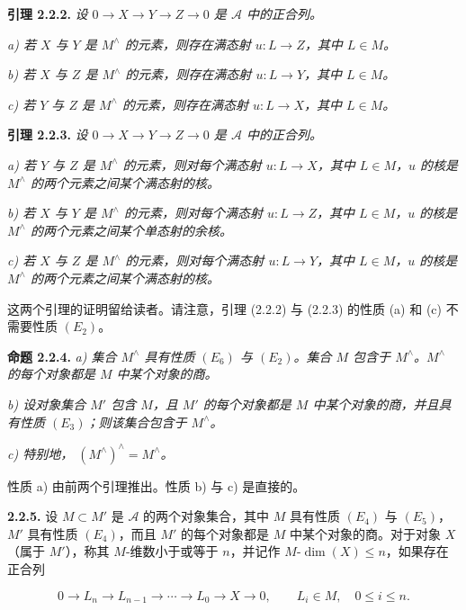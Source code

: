 \clearpage
{}%
\begingroup\small\setlength{\parskip}{0pt}\setlength{\emergencystretch}{1.5em}
\setlength{\abovedisplayskip}{4pt plus 2pt minus 2pt}%
\setlength{\belowdisplayskip}{4pt plus 2pt minus 2pt}%

\noindent\textbf{引理 2.2.2.}\quad
\textit{设
$0\longrightarrow X\longrightarrow Y\longrightarrow Z\longrightarrow0$
是 $\mathcal A$ 中的正合列。}

\noindent\textit{a) 若 $X$ 与 $Y$ 是 $M^{\wedge}$ 的元素，则存在满态射
$u\colon L\longrightarrow Z$，其中 $L\in M$。}

\noindent\textit{b) 若 $X$ 与 $Z$ 是 $M^{\wedge}$ 的元素，则存在满态射
$u\colon L\longrightarrow Y$，其中 $L\in M$。}

\noindent\textit{c) 若 $Y$ 与 $Z$ 是 $M^{\wedge}$ 的元素，则存在满态射
$u\colon L\longrightarrow X$，其中 $L\in M$。}

\medskip\noindent\textbf{引理 2.2.3.}\quad
\textit{设
$0\longrightarrow X\longrightarrow Y\longrightarrow Z\longrightarrow0$
是 $\mathcal A$ 中的正合列。}

\noindent\textit{a) 若 $Y$ 与 $Z$ 是 $M^{\wedge}$ 的元素，则对每个满态射
$u\colon L\longrightarrow X$，其中 $L\in M$，$u$ 的核是
$M^{\wedge}$ 的两个元素之间某个满态射的核。}

\noindent\textit{b) 若 $X$ 与 $Y$ 是 $M^{\wedge}$ 的元素，则对每个满态射
$u\colon L\longrightarrow Z$，其中 $L\in M$，$u$ 的核是
$M^{\wedge}$ 的两个元素之间某个单态射的余核。}

\noindent\textit{c) 若 $X$ 与 $Z$ 是 $M^{\wedge}$ 的元素，则对每个满态射
$u\colon L\longrightarrow Y$，其中 $L\in M$，$u$ 的核是
$M^{\wedge}$ 的两个元素之间某个满态射的核。}

这两个引理的证明留给读者。请注意，引理 (2.2.2) 与 (2.2.3) 的性质
(a) 和 (c) 不需要性质 $(E_2)$。

\medskip\noindent\textbf{命题 2.2.4.}\quad
\textit{a) 集合 $M^{\wedge}$ 具有性质 $(E_6)$ 与 $(E_2)$。集合
$M$ 包含于 $M^{\wedge}$。$M^{\wedge}$ 的每个对象都是 $M$ 中某个对象的商。}

\noindent\textit{b) 设对象集合 $M'$ 包含 $M$，且 $M'$ 的每个对象都是
$M$ 中某个对象的商，并且具有性质 $(E_3)$；则该集合包含于 $M^{\wedge}$。}

\noindent\textit{c) 特别地，
$(M^{\wedge})^{\wedge}=M^{\wedge}$。}

性质 a) 由前两个引理推出。性质 b) 与 c) 是直接的。

\medskip\noindent\textbf{2.2.5.}\quad
设 $M\subset M'$ 是 $\mathcal A$ 的两个对象集合，其中 $M$ 具有性质
$(E_4)$ 与 $(E_5)$，$M'$ 具有性质 $(E_4)$，而且 $M'$ 的每个对象都是
$M$ 中某个对象的商。对于对象 $X$（属于 $M'$），称其 $M$-维数小于或等于
$n$，并记作 $M\text{-}\dim(X)\leq n$，如果存在正合列

\[
0\longrightarrow L_n\longrightarrow L_{n-1}\longrightarrow\cdots
\longrightarrow L_0\longrightarrow X\longrightarrow0,
\qquad L_i\in M,\quad0\leq i\leq n.
\]
\endgroup
